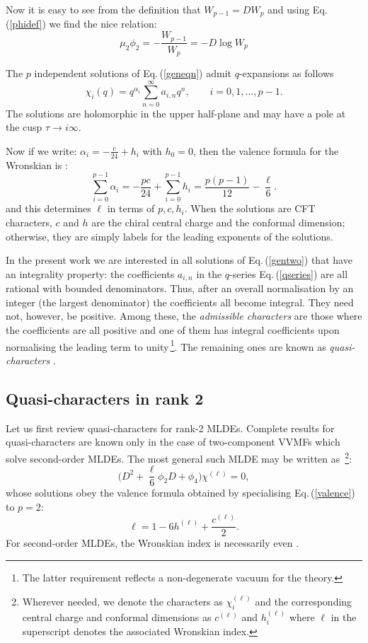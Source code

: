 \documentclass[11pt]{article}
\newcommand\be{\begin{equation}}
\newcommand\ee{\end{equation}}
\newcommand\sfrac[2]{{\textstyle\frac{#1}{#2}}}
\newcommand{\eref}[1]{Eq.\,(\ref{#1})}
\begin{document}
Now it is easy to see from the definition that $W_{p-1}=D W_p$ and using \eref{phidef} we find the nice relation:
\be
\mu_2\phi_2=-\frac{W_{p-1}}{W_p}=-D\log W_p
\label{phitwoprop}
\ee

The $p$ independent solutions of \eref{geneqn} admit $q$-expansions as follows
\be
\chi_i(q)=q^{\alpha_i}\sum_{n=0}^{\infty}a_{i,n}q^n,
\qquad i=0,1,\ldots,p-1.
\label{qseries}
\ee
The solutions are holomorphic in the upper half-plane and may have a pole at the cusp $\tau\to i\infty$.

Now if we write: $\alpha_{i}=-\frac{c}{24}+h_i$ with $h_0 = 0$, then the valence formula for the Wronskian is \cite{Mathur:1988na}:
\be
\sum_{i=0}^{p-1} \alpha_i = -\frac{pc}{24}+\sum_{i=0}^{p-1}h_i = \frac{p(p-1)}{12}-\frac{\ell}{6}.
\label{valence}
\ee
and this determines $\ell$ in terms of $p,c,h_i$. When the solutions are CFT characters, $c$ and $h$ are the chiral central
charge and the conformal dimension; otherwise, they are simply labels for the leading exponents of the solutions.

In the present work we are interested in all solutions of \eref{gentwo} that have an integrality property: the coefficients $a_{i,n}$ in the $q$-series \eref{qseries} are all rational with bounded denominators. Thus, after an overall normalisation by an integer (the largest denominator) the coefficients all become integral. They need not, however, be positive. Among these, the {\it admissible characters} are those where the coefficients are all positive and one of them has integral coefficients upon normalising the leading term to unity\,\footnote{The latter requirement reflects a non-degenerate vacuum for the theory.}. The remaining ones are known as {\it quasi-characters} \cite{Chandra:2018pjq}.

\subsection{Quasi-characters in rank 2} \label{sec:quasi2}
Let us first review quasi-characters for rank-2 MLDEs. Complete results for quasi-characters are known only in the case of two-component VVMFs which solve second-order MLDEs. The most general such MLDE may be written as \cite{Mathur:1988na}\,\footnote{Wherever needed, we denote the characters as $\chi^{(\ell)}_i$ and the corresponding central charge and conformal dimensions as $c^{(\ell)}$ and $h^{(\ell)}_i$ where $\ell$ in the superscript denotes the associated Wronskian index.}:
\be
\Big(D^2+\sfrac{\ell}{6}\phi_2D
+\phi_4\Big)\chi^{(\ell)}=0 ,
\label{gentwo}
\ee
whose solutions obey the valence formula obtained by specialising \eref{valence} to $p=2$:
\be
\ell=1-6h^{(\ell)}+\frac{c^{(\ell)}}{2}.
\label{valence.ch}
\ee
For second-order MLDEs, the Wronskian index is necessarily even
\cite{Naculich:1988xv}.
\end{document}
